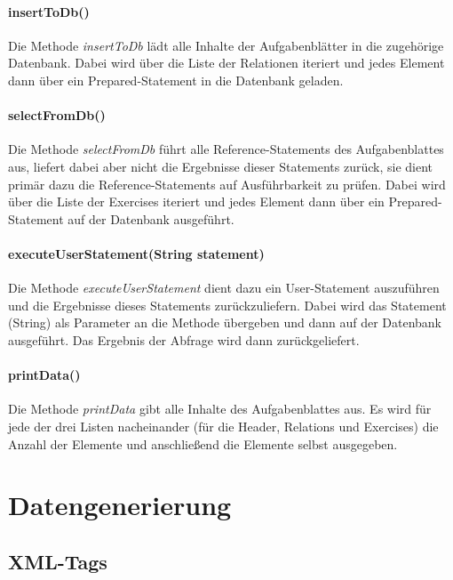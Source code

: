 \documentclass[11pt]{report}
\begin{document}
\subsubsection*{insertToDb()}

Die Methode \textit{insertToDb} lädt alle Inhalte der Aufgabenblätter in die zugehörige Datenbank. 
Dabei wird über die Liste der Relationen iteriert und jedes Element dann über ein Prepared-Statement in die Datenbank geladen.

\subsubsection*{selectFromDb()}

Die Methode \textit{selectFromDb} führt alle Reference-Statements des Aufgabenblattes aus, liefert dabei aber nicht die Ergebnisse dieser Statements zurück, sie dient primär dazu die Reference-Statements auf Ausführbarkeit zu prüfen.
Dabei wird über die Liste der Exercises iteriert und jedes Element dann über ein Prepared-Statement auf der Datenbank ausgeführt.

\subsubsection*{executeUserStatement(String statement)}

Die Methode \textit{executeUserStatement} dient dazu ein User-Statement auszuführen und die Ergebnisse dieses Statements zurückzuliefern.
Dabei wird das Statement (String) als Parameter an die Methode übergeben und dann auf der Datenbank ausgeführt. Das Ergebnis der Abfrage wird dann zurückgeliefert.

\subsubsection*{printData()}

Die Methode \textit{printData} gibt alle Inhalte des Aufgabenblattes aus.
Es wird für jede der drei Listen nacheinander (für die Header, Relations und Exercises) die Anzahl der Elemente und anschließend die Elemente selbst ausgegeben.

\chapter{Datengenerierung}

\section{XML-Tags}
\end{document}
